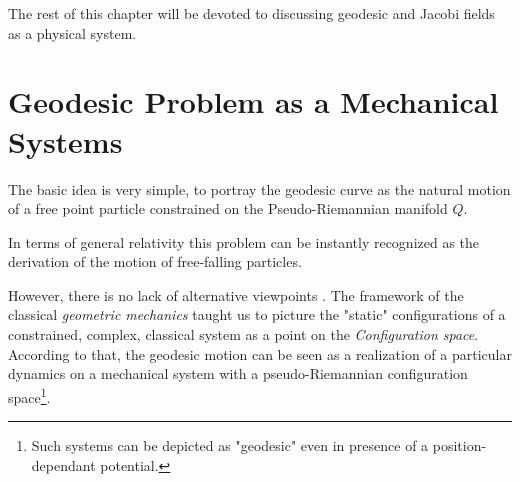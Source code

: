 \documentclass[Main]{subfiles}
\begin{document}
	
	
	
	
	The rest of this chapter will be devoted to discussing geodesic and Jacobi fields
	as a physical system.


\section{Geodesic Problem as a Mechanical Systems}\label{GeodesicMechanics}
	The basic idea is very simple, to portray the geodesic curve as the natural motion of a free point particle constrained on the Pseudo-Riemannian manifold $Q$.
	
	\begin{remark}
	In terms of general relativity this problem can be instantly recognized as the derivation of the motion of free-falling particles.
	
	However, there is no lack of alternative viewpoints .
	The framework of the classical \emph{geometric mechanics} taught us to picture the "static" configurations of a constrained, complex, classical system as a point on the \emph{Configuration space}.%
	According to that, the geodesic motion can be seen as a realization of a particular dynamics on a mechanical system with a pseudo-Riemannian configuration space\footnote{Such systems can be depicted as "geodesic" even in presence of a position-dependant potential.\cite[Cap 3.7]{Abraham1978}}.
	\end{remark}


\end{document}
